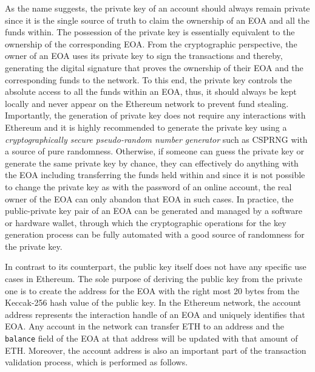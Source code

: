 As the name suggests, the private key of an account should always remain private since it is the single source of truth to claim the ownership of an EOA and all the funds within. The possession of the private key is essentially equivalent to the ownership of the corresponding EOA. From the cryptographic perspective, the owner of an EOA uses its private key to sign the transactions and thereby, generating the digital signature that proves the ownership of their EOA and the corresponding funds to the network. To this end, the private key controls the absolute access to all the funds within an EOA, thus, it should always be kept locally and never appear on the Ethereum network to prevent fund stealing. Importantly, the generation of private key does not require any interactions with Ethereum and it is highly recommended to generate the private key using a \textit{cryptographically secure pseudo-random number generator} such as CSPRNG \cite{antonopoulos2018mastering} with a source of pure randomness. Otherwise, if someone can guess the private key or generate the same private key by chance, they can effectively do anything with the EOA including transferring the funds held within and since it is not possible to change the private key as with the password of an online account, the real owner of the EOA can only abandon that EOA in such cases. In practice, the public-private key pair of an EOA can be generated and managed by a software or hardware wallet, through which the cryptographic operations for the key generation process can be fully automated with a good source of randomness for the private key.

In contrast to its counterpart, the public key itself does not have any specific use cases in Ethereum. The sole purpose of deriving the public key from the private one is to create the address for the EOA with the right most 20 bytes from the Keccak-256 hash value of the public key. In the Ethereum network, the account address represents the interaction handle of an EOA and uniquely identifies that EOA. Any account in the network can transfer ETH to an address and the \texttt{balance} field of the EOA at that address will be updated with that amount of ETH. Moreover, the account address is also an important part of the transaction validation process, which is performed as follows.

